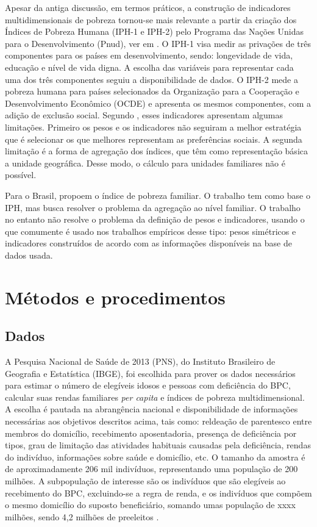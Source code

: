 \documentclass[
	12pt,				%
	openright,			%
	twoside,			%
	a4paper,			%
	english,			%
	french,				%
	spanish,			%
	brazil				%
	]{abntex2}
\begin{document}
Apesar da antiga discussão, em termos práticos, a construção de indicadores multidimensionais de pobreza tornou-se mais relevante a partir da criação dos
Índices de Pobreza Humana (IPH-1 e IPH-2) pelo Programa das Nações Unidas para
o Desenvolvimento (Pnud), ver em \cite{pnud1990}. O IPH-1 visa medir as privações de três componentes para os países em desenvolvimento, sendo: longevidade de vida, educação e nível de vida digna. A escolha das variáveis para representar cada uma dos três componentes seguiu a disponibilidade de dados. O IPH-2 mede a pobreza humana para países selecionados da Organização para a Cooperação e Desenvolvimento Econômico (OCDE) e apresenta os mesmos componentes, com a adição de exclusão social. Segundo , esses indicadores apresentam algumas limitações. Primeiro os pesos e os indicadores não seguiram a melhor estratégia que é selecionar os que melhores representam as preferências sociais. A segunda limitação é a forma de agregação dos índices, que têm como representação básica a unidade geográfica. Desse modo, o cálculo para unidades familiares não é possível. 

Para o Brasil,  propoem o índice de pobreza familiar. O trabalho tem como base o IPH, mas busca resolver o problema da agregação ao nível familiar. O trabalho no entanto não resolve o problema da definição de pesos e indicadores, usando o que comumente é usado nos trabalhos empíricos desse tipo: pesos simétricos e indicadores construídos de acordo com as informações disponíveis na base de dados usada.
  







\chapter{Métodos e procedimentos}
	\section{Dados}
	A Pesquisa Nacional de Saúde de 2013 (PNS), do Instituto Brasileiro de Geografia e Estatística (IBGE), foi escolhida para prover os dados necessários para estimar o número de elegíveis idosos e pessoas com deficiência do BPC, calcular suas rendas familiares \textit{per capita} e índices de pobreza multidimensional. A escolha é pautada na abrangência nacional e disponibilidade de informações necessárias aos objetivos descritos acima, tais como: reldeação de parentesco entre membros do domicílio, recebimento  aposentadoria, presença de deficiência por tipos, grau de limitação das atividades habituais causadas pela deficiência, rendas do indivíduo, informações sobre saúde e domicílio, etc.   
	O tamanho da amostra é de aproximadamente 206 mil indivíduos, representando uma população de 200 milhões. A subpopulação de interesse são os indivíduos que são elegíveis ao recebimento do BPC, excluindo-se a regra de renda, e os indivíduos que compõem o mesmo domicílio do suposto beneficiário, somando umas população de xxxx milhões, sendo 4,2 milhões de preeleitos .
	
\end{document}
